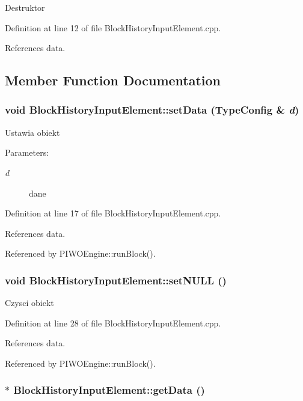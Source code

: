Destruktor 

Definition at line 12 of file BlockHistoryInputElement.cpp.

References data.

\subsection{Member Function Documentation}
\hypertarget{classBlockHistoryInputElement_4a8ebf161f64bbb97cf8b694cd6a72bf}{
\subsubsection[setData]{\setlength{\rightskip}{0pt plus 5cm}void BlockHistoryInputElement::setData ({\bf TypeConfig} \& {\em d})}}
\label{classBlockHistoryInputElement_4a8ebf161f64bbb97cf8b694cd6a72bf}


Ustawia obiekt \begin{Desc}
\item[Parameters:]
\begin{description}
\item[{\em d}]dane \end{description}
\end{Desc}


Definition at line 17 of file BlockHistoryInputElement.cpp.

References data.

Referenced by PIWOEngine::runBlock().\hypertarget{classBlockHistoryInputElement_a3c4c677fcb9c0dbb8f3e31314627ca1}{
\subsubsection[setNULL]{\setlength{\rightskip}{0pt plus 5cm}void BlockHistoryInputElement::setNULL ()}}
\label{classBlockHistoryInputElement_a3c4c677fcb9c0dbb8f3e31314627ca1}


Czysci obiekt 

Definition at line 28 of file BlockHistoryInputElement.cpp.

References data.

Referenced by PIWOEngine::runBlock().\hypertarget{classBlockHistoryInputElement_d980299844b1b410df13ef28502c73fd}{
\subsubsection[getData]{ $\ast$ BlockHistoryInputElement::getData ()}}
\label{classBlockHistoryInputElement_d980299844b1b410df13ef28502c73fd}


